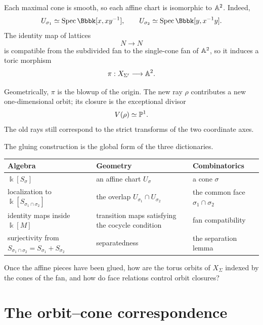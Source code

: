 \begin{example}
Each maximal cone is smooth, so each affine chart is isomorphic to
\(\mathbb{A}^2\). Indeed,
\[
U_{\sigma_1}\simeq\Spec\Bbbk[x,xy^{-1}],
\qquad
U_{\sigma_2}\simeq\Spec\Bbbk[y,x^{-1}y].
\]
The identity map of lattices
\[
N\longrightarrow N
\]
is compatible from the subdivided fan to the single-cone fan of
\(\mathbb{A}^2\), so it induces a toric morphism
\[
\pi:X_{\Sigma'}\longrightarrow \mathbb{A}^2.
\]

Geometrically, \(\pi\) is the blowup of the origin. The new ray
\(\rho\) contributes a new one-dimensional orbit; its closure is the
exceptional divisor
\[
V(\rho)\simeq\mathbb{P}^1.
\]
The old rays still correspond to the strict transforms of the two
coordinate axes.
\end{example}

\begin{threedictionaries}
The gluing construction is the global form of the three dictionaries.

\medskip

\begin{center}
\small
\begin{tabularx}{\linewidth}{@{}
  >{\raggedright\arraybackslash}X
  >{\raggedright\arraybackslash}X
  >{\raggedright\arraybackslash}X@{}}
\toprule
\textbf{Algebra}
&
\textbf{Geometry}
&
\textbf{Combinatorics}
\\
\midrule
\(\Bbbk[S_\sigma]\)
&
an affine chart \(U_\sigma\)
&
a cone \(\sigma\)
\\[1mm]
localization to
\(\Bbbk[S_{\sigma_1\cap\sigma_2}]\)
&
the overlap
\(U_{\sigma_1}\cap U_{\sigma_2}\)
&
the common face
\(\sigma_1\cap\sigma_2\)
\\[1mm]
identity maps inside \(\Bbbk[M]\)
&
transition maps satisfying the cocycle condition
&
fan compatibility
\\[1mm]
surjectivity from
\(S_{\sigma_1\cap\sigma_2}
=S_{\sigma_1}+S_{\sigma_2}\)
&
separatedness
&
the separation lemma
\\
\bottomrule
\end{tabularx}
\end{center}
\end{threedictionaries}

\begin{guidingquestion}
Once the affine pieces have been glued, how are the torus orbits of
\(X_\Sigma\) indexed by the cones of the fan, and how do face
relations control orbit closures?
\end{guidingquestion}


\section{The orbit--cone correspondence}
\label{sec:orbit-cone-correspondence}

